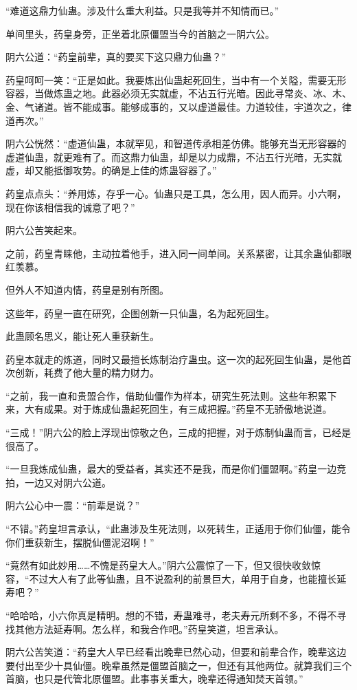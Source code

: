 \begin{this_body}
“难道这鼎力仙蛊。涉及什么重大利益。只是我等并不知情而已。”

单间里头，药皇身旁，正坐着北原僵盟当今的首脑之一阴六公。

阴六公道：“药皇前辈，真的要买下这只鼎力仙蛊？”

药皇呵呵一笑：“正是如此。我要炼出仙蛊起死回生，当中有一个关隘，需要无形容器，当做炼蛊之地。此器必须无实就虚，不沾五行光暗。因此寻常炎、冰、木、金、气诸道。皆不能成事。能够成事的，又以虚道最佳。力道较佳，宇道次之，律道再次。”

阴六公恍然：“虚道仙蛊，本就罕见，和智道传承相差仿佛。能够充当无形容器的虚道仙蛊，就更难有了。而这鼎力仙蛊，却是以力成鼎，不沾五行光暗，无实就虚，却又能抵御攻势。的确是上佳的炼蛊容器了。”

药皇点点头：“养用炼，存乎一心。仙蛊只是工具，怎么用，因人而异。小六啊，现在你该相信我的诚意了吧？”

阴六公苦笑起来。

之前，药皇青睐他，主动拉着他手，进入同一间单间。关系紧密，让其余蛊仙都眼红羡慕。

但外人不知道内情，药皇是别有所图。

这些年，药皇一直在研究，企图创新一只仙蛊，名为起死回生。

此蛊顾名思义，能让死人重获新生。

药皇本就走的炼道，同时又最擅长炼制治疗蛊虫。这一次的起死回生仙蛊，是他首次创新，耗费了他大量的精力财力。

“之前，我一直和贵盟合作，借助仙僵作为样本，研究生死法则。这些年积累下来，大有成果。对于炼成仙蛊起死回生，有三成把握。”药皇不无骄傲地说道。

“三成！”阴六公的脸上浮现出惊敬之色，三成的把握，对于炼制仙蛊而言，已经是很高了。

“一旦我炼成仙蛊，最大的受益者，其实还不是我，而是你们僵盟啊。”药皇一边竞拍，一边又对阴六公道。

阴六公心中一震：“前辈是说？”

“不错。”药皇坦言承认，“此蛊涉及生死法则，以死转生，正适用于你们仙僵，能令你们重获新生，摆脱仙僵泥沼啊！”

“竟然有如此妙用……不愧是药皇大人。”阴六公震惊了一下，但又很快收敛惊容，“不过大人有了此等仙蛊，且不说盈利的前景巨大，单用于自身，也能擅长延寿吧？”

“哈哈哈，小六你真是精明。想的不错，寿蛊难寻，老夫寿元所剩不多，不得不寻找其他方法延寿啊。怎么样，和我合作吧。”药皇笑道，坦言承认。

阴六公苦笑道：“药皇大人早已经看出晚辈已然心动，但要和前辈合作，晚辈这边要付出至少十具仙僵。晚辈虽然是僵盟首脑之一，但还有其他两位。就算我们三个首脑，也只是代管北原僵盟。此事事关重大，晚辈还得通知焚天首领。”


\end{this_body}
